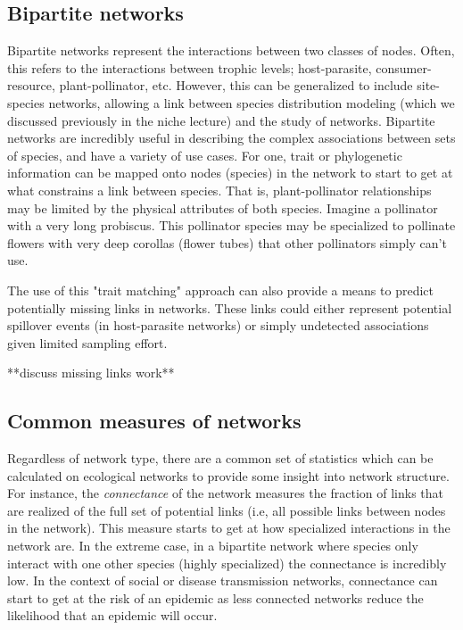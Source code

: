 \documentclass[12pt]{article}
\begin{document}
\bigskip
\subsection*{Bipartite networks}
Bipartite networks represent the interactions between two classes of nodes. Often, this refers to the interactions between trophic levels; host-parasite, consumer-resource, plant-pollinator, etc. However, this can be generalized to include site-species networks, allowing a link between species distribution modeling (which we discussed previously in the niche lecture) and the study of networks. Bipartite networks are incredibly useful in describing the complex associations between sets of species, and have a variety of use cases. For one, trait or phylogenetic information can be mapped onto nodes (species) in the network to start to get at what constrains a link between species. That is, plant-pollinator relationships may be limited by the physical attributes of both species. Imagine a pollinator with a very long probiscus. This pollinator species may be specialized to pollinate flowers with very deep corollas (flower tubes) that other pollinators simply can't use. 



The use of this "trait matching" approach can also provide a means to predict potentially missing links in networks. These links could either represent potential spillover events (in host-parasite networks) or simply undetected associations given limited sampling effort. 


**discuss missing links work**









\bigskip
\subsection*{Common measures of networks}
Regardless of network type, there are a common set of statistics which can be calculated on ecological networks to provide some insight into network structure. For instance, the \textit{connectance} of the network measures the fraction of links that are realized of the full set of potential links (i.e, all possible links between nodes in the network). This measure starts to get at how specialized interactions in the network are. In the extreme case, in a bipartite network where species only interact with one other species (highly specialized) the connectance is incredibly low. In the context of social or disease transmission networks, connectance can start to get at the risk of an epidemic as less connected networks reduce the likelihood that an epidemic will occur. 
\end{document}
